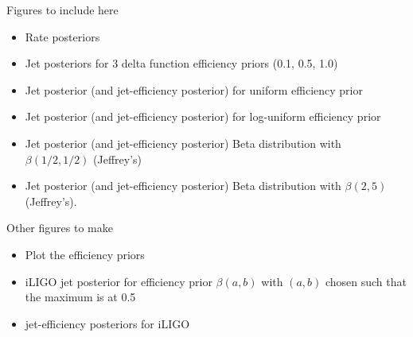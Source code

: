 \documentclass[twocolumn,nofootinbib]{revtex4-1}
\begin{document}
Figures to include here
\begin{itemize}
\item Rate posteriors
\item Jet posteriors for 3 delta function efficiency priors (0.1, 0.5, 1.0)
\item Jet posterior (and jet-efficiency posterior) for uniform efficiency prior
\item Jet posterior (and jet-efficiency posterior) for log-uniform efficiency
prior 
\item Jet posterior (and jet-efficiency posterior) Beta distribution with
$\beta(1/2,1/2)$ (Jeffrey's)
\item Jet posterior (and jet-efficiency posterior) Beta distribution with
$\beta(2,5)$ (Jeffrey's).
\end{itemize}

Other figures to make
\begin{itemize}
\item Plot the efficiency priors
\item iLIGO jet posterior for efficiency prior $\beta(a,b)$ with $(a,b)$ chosen
such that the maximum is at 0.5
\item jet-efficiency posteriors for iLIGO
\end{itemize}
\end{document}
